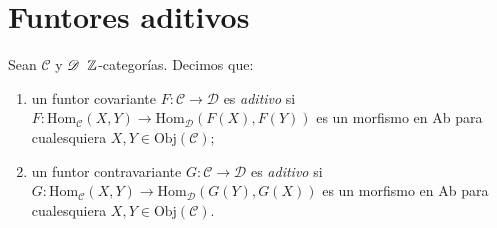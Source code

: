\documentclass[tesis]{subfiles}
\begin{document}
\section{Funtores aditivos} \label{Sec: Funtores aditivos}

\begin{Def}\label{Def: Funtor aditivo}
    Sean $\mathscr{C}$ y $\mathscr{D} \hspace{2mm} \mathbb{Z}$-categorías. Decimos que:

    \begin{enumerate}[label=(\alph*)]
    
        \item un funtor covariante $F:\mathscr{C}\to \mathscr{D}$ es \emph{aditivo} si $F:\text{Hom}_\mathscr{C}(X,Y)\to \text{Hom}_\mathscr{D}(F(X),F(Y))$ es un morfismo en Ab para cualesquiera $X,Y\in\text{Obj}(\mathscr{C})$;

        \item un funtor contravariante $G:\mathscr{C}\to \mathscr{D}$ es \emph{aditivo} si $G:\text{Hom}_\mathscr{C}(X,Y)\to \text{Hom}_\mathscr{D}(G(Y),G(X))$ es un morfismo en Ab para cualesquiera $X,Y\in\text{Obj}(\mathscr{C})$.%

    \end{enumerate}
\end{Def}
\end{document}
